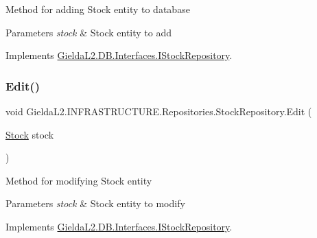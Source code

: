 Method for adding Stock entity to database 


\begin{DoxyParams}{Parameters}
{\em stock} & Stock entity to add\\
\hline
\end{DoxyParams}


Implements \mbox{\hyperlink{interface_gielda_l2_1_1_d_b_1_1_interfaces_1_1_i_stock_repository_a602e2dcb80b5c6e13e2db9ff57afa96b}{Gielda\+L2.\+D\+B.\+Interfaces.\+I\+Stock\+Repository}}.

\mbox{\label{class_gielda_l2_1_1_i_n_f_r_a_s_t_r_u_c_t_u_r_e_1_1_repositories_1_1_stock_repository_aaf7203a96523df7f04c2a0a8fde5b1fe}} 
\subsubsection{\texorpdfstring{Edit()}{Edit()}}
{\footnotesize\ttfamily void Gielda\+L2.\+I\+N\+F\+R\+A\+S\+T\+R\+U\+C\+T\+U\+R\+E.\+Repositories.\+Stock\+Repository.\+Edit (\begin{DoxyParamCaption}\item[{\mbox{\hyperlink{class_gielda_l2_1_1_d_b_1_1_entities_1_1_stock}{Stock}}}]{stock }\end{DoxyParamCaption})}



Method for modifying Stock entity 


\begin{DoxyParams}{Parameters}
{\em stock} & Stock entity to modify\\
\hline
\end{DoxyParams}


Implements \mbox{\hyperlink{interface_gielda_l2_1_1_d_b_1_1_interfaces_1_1_i_stock_repository_aa24bb25092f2082b4bdf0d5744e3127f}{Gielda\+L2.\+D\+B.\+Interfaces.\+I\+Stock\+Repository}}.

\mbox{\label{class_gielda_l2_1_1_i_n_f_r_a_s_t_r_u_c_t_u_r_e_1_1_repositories_1_1_stock_repository_a444dab153a9efe503ab774da96cfa4e7}} 
